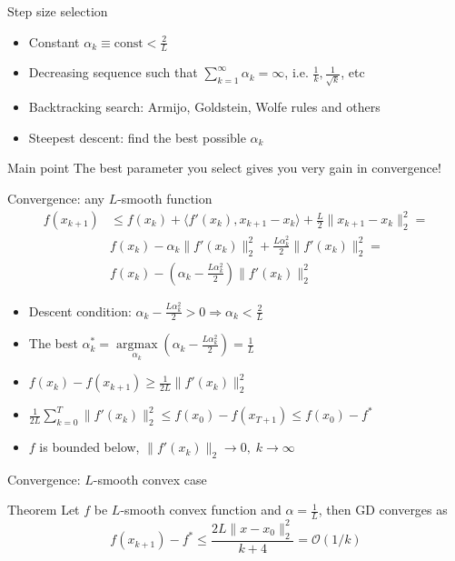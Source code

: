 \documentclass{beamer}
\DeclareMathOperator*{\argmax}{\arg\max}
\begin{document}
\begin{frame}{Step size selection}

\begin{itemize}
\item Constant $\alpha_k \equiv \mathrm{const} < \frac{2}{L}$
\item Decreasing sequence such that $\sum\limits_{k=1}^{\infty} \alpha_k = \infty$, i.e. $\frac{1}{k}, \frac{1}{\sqrt{k}}$, etc
\item Backtracking search: Armijo, Goldstein, Wolfe rules and others
\item Steepest descent: find the best possible $\alpha_k$
\end{itemize}

\begin{block}{Main point}
The best parameter you select gives you very gain in convergence! 
\end{block}

\end{frame}

\begin{frame}{Convergence: any $L$-smooth function}
\begin{equation*}
\begin{split}
f(x_{k+1}) &\leq f(x_k) + \langle f'(x_k), x_{k+1} - x_k \rangle + \frac{L}{2}\|x_{k+1} - x_k\|_2^2 = \\
& f(x_k) - \alpha_k \|f'(x_k)\|_2^2 + \frac{L \alpha^2_k}{2} \|f'(x_k)\|_2^2 = \\
& f(x_k) - \left(\alpha_k - \frac{L\alpha_k^2}{2}\right)\|f'(x_k)\|_2^2
\end{split}
\end{equation*}
\begin{itemize}
\item Descent condition: $\alpha_k - \frac{L\alpha_k^2}{2} > 0 \Rightarrow \alpha_k < \frac{2}{L}$
\item  The best $\alpha^*_k = \argmax\limits_{\alpha_k}\left(\alpha_k - \frac{L\alpha_k^2}{2}\right) = \frac{1}{L}$
\item $f(x_k) - f(x_{k+1}) \geq \frac{1}{2L}\|f'(x_k)\|_2^2$
\item $\frac{1}{2L} \sum\limits_{k=0}^T \|f'(x_k)\|_2^2 \leq f(x_0) - f(x_{T+1}) \leq f(x_0) - f^*$
\item $f$ is bounded below, $\|f'(x_k)\|_2 \to 0, \; k \to \infty$
\end{itemize}
\end{frame}

\begin{frame}{Convergence: $L$-smooth convex case}
\begin{block}{Theorem}
Let $f$ be $L$-smooth convex function and $\alpha = \frac{1}{L}$, then GD converges as
\[
f(x_{k+1}) - f^* \leq \frac{2L\|x - x_0\|^2_2}{k+4} = \mathcal{O}(1 / k)
\]
\end{block}
\end{frame}
\end{document}
